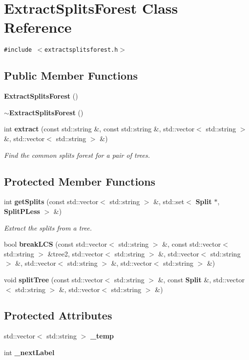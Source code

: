 \section{Extract\-Splits\-Forest Class Reference}
\label{classExtractSplitsForest}
{\tt \#include $<$extractsplitsforest.h$>$}

\subsection*{Public Member Functions}
\begin{CompactItemize}
\item 
{\bf Extract\-Splits\-Forest} ()
\item 
{\bf $\sim$Extract\-Splits\-Forest} ()
\item 
int {\bf extract} (const std::string \&, const std::string \&, std::vector$<$ std::string $>$ \&, std::vector$<$ std::string $>$ \&)
\begin{CompactList}\small\item\em Find the common splits forest for a pair of trees. \item\end{CompactList}\end{CompactItemize}
\subsection*{Protected Member Functions}
\begin{CompactItemize}
\item 
int {\bf get\-Splits} (const std::vector$<$ std::string $>$ \&, std::set$<$ {\bf Split} $\ast$, {\bf Split\-PLess} $>$ \&)
\begin{CompactList}\small\item\em Extract the splits from a tree. \item\end{CompactList}\item 
bool {\bf break\-LCS} (const std::vector$<$ std::string $>$ \&, const std::vector$<$ std::string $>$ \&tree2, std::vector$<$ std::string $>$ \&, std::vector$<$ std::string $>$ \&, std::vector$<$ std::string $>$ \&, std::vector$<$ std::string $>$ \&)
\item 
void {\bf split\-Tree} (const std::vector$<$ std::string $>$ \&, const {\bf Split} \&, std::vector$<$ std::string $>$ \&, std::vector$<$ std::string $>$ \&)
\end{CompactItemize}
\subsection*{Protected Attributes}
\begin{CompactItemize}
\item 
std::vector$<$ std::string $>$ {\bf \_\-temp}
\item 
int {\bf \_\-next\-Label}
\end{CompactItemize}



